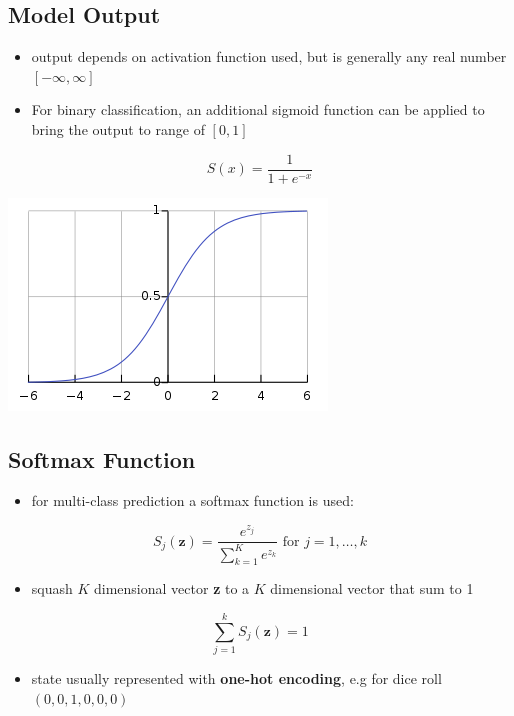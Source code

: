 \documentclass[11pt]{article}
\begin{document}
\subsection*{Model Output}
\label{sec:org67ea5da}
\begin{itemize}
\item output depends on activation function used, but is generally any real number \([-\infty, \infty]\)
\item For binary classification, an additional sigmoid function can be applied to
bring the output to range of \([0,1]\)
\end{itemize}
$$S(x) = \frac{1}{1+e^{-x}}$$

\begin{center}
\begin{center}
\includegraphics[width=.9\linewidth]{images/sigmoid.png}
\end{center}
\end{center}
\subsection*{Softmax Function}
\label{sec:org538a7a5}
\begin{itemize}
\item for multi-class prediction a softmax function is used:
\end{itemize}
$$S_j(\boldsymbol{z}) = \frac{e^{z_j}}{\sum_{k=1}^K e^{z_k}} \text{ for }j=1,\dots,k$$
\begin{itemize}
\item squash \(K\) dimensional vector \textbf{z} to a \(K\) dimensional vector that sum to 1
\end{itemize}
$$\sum_{j=1}^k S_j(\boldsymbol{z}) = 1$$
\begin{itemize}
\item state usually represented with \textbf{one-hot encoding}, e.g for dice roll \((0,0,1,0,0,0)\)
\end{itemize}
\end{document}
